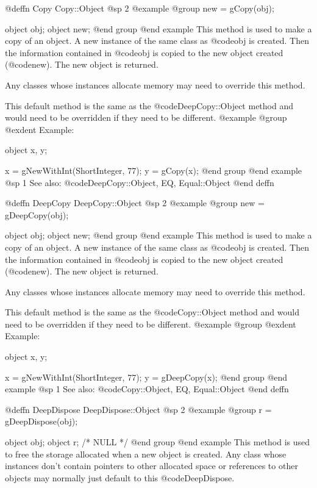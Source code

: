 @deffn {Copy} Copy::Object
@sp 2
@example
@group
new = gCopy(obj);

object  obj;
object  new;
@end group
@end example
This method is used to make a copy of an object.  A new instance
of the same class as @code{obj} is created.  Then the information
contained in @code{obj} is copied to the new object created (@code{new}).
The new object is returned.

Any classes whose instances allocate memory may need to override this method.

This default method is the same as the @code{DeepCopy::Object} method and
would need to be overridden if they need to be different.
@example
@group
@exdent Example:

object  x, y;

x = gNewWithInt(ShortInteger, 77);
y = gCopy(x);
@end group
@end example
@sp 1
See also:  @code{DeepCopy::Object, EQ, Equal::Object}
@end deffn












@deffn {DeepCopy} DeepCopy::Object
@sp 2
@example
@group
new = gDeepCopy(obj);

object  obj;
object  new;
@end group
@end example
This method is used to make a copy of an object.  A new instance
of the same class as @code{obj} is created.  Then the information
contained in @code{obj} is copied to the new object created (@code{new}).
The new object is returned.

Any classes whose instances allocate memory may need to override this method.

This default method is the same as the @code{Copy::Object} method and
would need to be overridden if they need to be different.
@example
@group
@exdent Example:

object  x, y;

x = gNewWithInt(ShortInteger, 77);
y = gDeepCopy(x);
@end group
@end example
@sp 1
See also:  @code{Copy::Object, EQ, Equal::Object}
@end deffn









@deffn {DeepDispose} DeepDispose::Object
@sp 2
@example
@group
r = gDeepDispose(obj);

object  obj;
object  r;     /*  NULL  */
@end group
@end example
This method is used to free the storage allocated when a new object is
created.  Any class whose instances don't contain pointers to other
allocated space or references to other objects may normally just default
to this @code{DeepDispose}.


